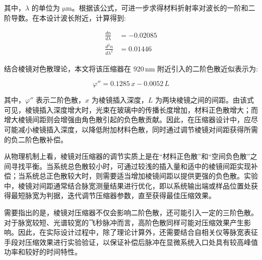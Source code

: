其中，$\lambda$ 的单位为 $\mathrm{\mu m}$。根据该公式，可进一步求得材料折射率对波长的一阶和二阶导数。在本设计波长附近，计算得到:

\begin{align}
    \frac{dn}{d\lambda} &= -0.02085\\
    \frac{d^{2}n}{d\lambda^{2}} &= 0.01446
\end{align}

结合棱镜对色散理论，本文将该压缩器在 920\,nm 附近引入的二阶色散近似表示为:

\begin{equation}
    \varphi'' = 0.1285\,x - 0.0052\,L
\end{equation}

其中，$\varphi''$ 表示二阶色散，$x$ 为棱镜插入深度，$L$ 为两块棱镜之间的间距。由该式可见，棱镜插入深度增大时，光束在玻璃中的传播长度增加，材料正色散增大；而增大棱镜间距则会增强由角色散引起的负色散贡献。因此，在压缩器设计中，应尽可能减小棱镜插入深度，以降低附加材料色散，同时通过调节棱镜对间距获得所需的负二阶色散补偿。

从物理机制上看，棱镜对压缩器的调节实质上是在``材料正色散''和``空间负色散''之间寻找平衡。当系统总色散较小时，可通过较浅的插入量和适中的棱镜间距实现补偿；当系统总正色散较大时，则需要适当增加棱镜间距以提供更强的负色散。实验中，棱镜对间距通常结合脉宽测量结果进行优化，即以系统输出端或样品位置处获得最短脉宽为判据，迭代调节压缩器参数，直至获得最佳压缩效果。

需要指出的是，棱镜对压缩器不仅会影响二阶色散，还可能引入一定的三阶色散。对于脉宽较短、光谱较宽的飞秒脉冲而言，高阶色散同样可能对压缩效果产生影响。因此，在实际设计过程中，除了理论计算外，还需要结合自相关仪等脉宽表征手段对压缩效果进行实验验证，以保证补偿后脉冲在显微系统入口处具有较高峰值功率和较好的时间特性。



